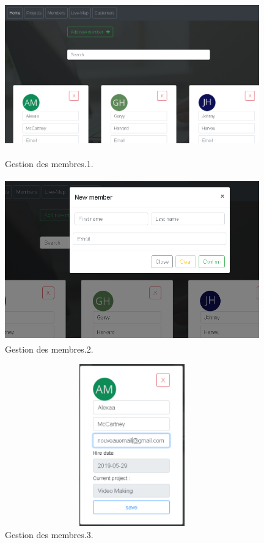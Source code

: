 \bigskip
\bigskip

\FloatBarrier
\begin{figure}[H]
\center
\includegraphics[width=11cm,height=7cm]{./figures/pres/mm1.png}
\caption{Gestion des membres.1.}
\end{figure}
\FloatBarrier



\FloatBarrier
\begin{figure}[H]
\center
\includegraphics[width=11cm,height=7cm]{./figures/pres/mm2.png}
\caption{Gestion des membres.2.}
\end{figure}
\FloatBarrier


\FloatBarrier
\begin{figure}[H]
\center
\includegraphics[width=11cm,height=7cm]{./figures/pres/mm3.png}
\caption{Gestion des membres.3.}
\end{figure}
\FloatBarrier

